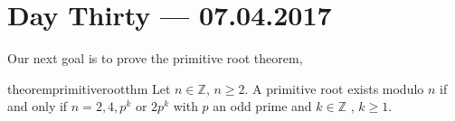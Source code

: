 \documentclass{amsbook}
\theoremstyle{plain}
\theoremstyle{definition}
\theoremstyle{remark}
\numberwithin{equation}{chapter}
\numberwithin{figure}{chapter}
\newcommand{\Z}{\mathbb{Z}}
\begin{document}
\chapter[Lecture Thirty]{Day Thirty \hfill {\footnotesize \rm --- 07.04.2017}}

Our next goal is to prove the primitive root theorem,
\begin{restatable}{theorem}{primitiverootthm}\label{thm:prim_rt_thm}
  Let $n \in \Z$, $n \geqslant 2$. A primitive root exists modulo $n$ if and only if $n = 2, 4, p^k \text { or } 2p^k$ with $p$ an odd prime and $k \in \Z$ , $k \geqslant 1$. 
\end{restatable}
\end{document}
